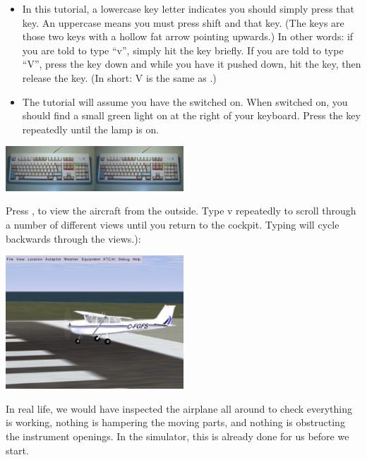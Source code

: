 \begin{itemize}
\begin{itemize}
    \item In this tutorial, a lowercase key letter indicates you should simply
  press that key. An uppercase means you must press shift and that key.
  (The \textcolor{blue}{} keys are those two keys with
  a hollow fat arrow pointing upwards.) In other words: if you are told to type
  ``v'', simply hit the  key briefly.
   If you are told to type ``V'',
  press the  key down and while you have it pushed down, hit the
   key, then release the   key. (In short: V is the same as
  .)
    \item The tutorial will assume you have the  switched on.
   When switched on, you should find a small green
  light on at the right of your keyboard. Press the
  \textcolor{green}{} key repeatedly until the lamp is on.
\end{itemize}

\begin{center}
\includegraphics[width=0.5\textwidth]{img/tut_7}
\end{center}

Press , to view the aircraft from the outside. Type v repeatedly to
scroll through a number of different views until you return to the cockpit.
Typing  will cycle backwards through the views.):

\begin{center}
\includegraphics[width=0.5\textwidth]{img/tut_8}
\end{center}

In real life, we would have inspected the airplane all around to check
everything is working, nothing is hampering the moving parts,
and nothing is obstructing the instrument openings. In the simulator, this is
already done for us before we start.


\end{itemize}
